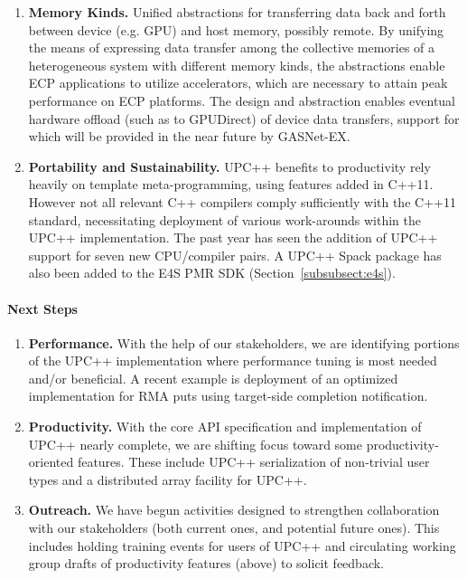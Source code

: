 \begin{enumerate}
\item \textbf{Memory Kinds.}
Unified abstractions for 
transferring data back and forth between device (e.g. GPU) and host memory, possibly remote.
By unifying the means of expressing data transfer among the collective memories of a heterogeneous system with different memory kinds,
the abstractions enable ECP applications to utilize accelerators, which are necessary to attain peak performance on ECP platforms.
The design and abstraction enables eventual hardware offload (such as to GPUDirect) of device data transfers, support for which will be provided in the near future by GASNet-EX.

\item \textbf{Portability and Sustainability.}
UPC++ benefits to productivity rely heavily on template meta-programming, using features added in C++11.
However not all relevant C++ compilers comply sufficiently with the C++11 standard, 
necessitating deployment of various work-arounds within the UPC++ implementation.
The past year has seen the addition of UPC++ support for seven new CPU/compiler pairs.
A UPC++ Spack package has also been added to the E4S PMR SDK (Section~\ref{subsubsect:e4s}).

\end{enumerate}

\paragraph{Next Steps}

\begin{enumerate}
\item \textbf{Performance.}
With the help of our stakeholders, we are identifying portions of the UPC++
implementation where performance tuning is most needed and/or beneficial.
A recent example is deployment of an optimized implementation for
RMA puts using target-side completion notification.

\item \textbf{Productivity.}
With the core API specification and implementation of UPC++ nearly complete, we
are shifting focus toward some productivity-oriented features.  These include
UPC++ serialization of non-trivial user types and a distributed array facility
for UPC++.

\item \textbf{Outreach.}
We have begun activities designed to strengthen collaboration with our
stakeholders (both current ones, and potential future ones).  This includes
holding training events for users of UPC++ and circulating working group
drafts of productivity features (above) to solicit feedback.

\end{enumerate}
